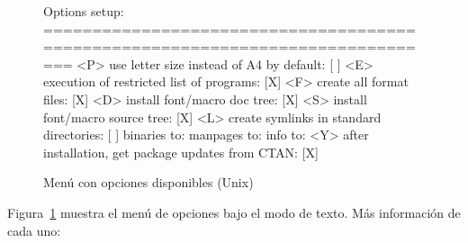 \documentclass{article}
\begin{document}
\begin{figure}[tbh]
\begin{boxedverbatim}
Options setup:
===============================================================================
 <P> use letter size instead of A4 by default: [ ]
 <E> execution of restricted list of programs: [X]
 <F> create all format files:                  [X]
 <D> install font/macro doc tree:              [X]
 <S> install font/macro source tree:           [X]
 <L> create symlinks in standard directories:  [ ]
            binaries to:
            manpages to:
                info to:
 <Y> after installation, get package updates from CTAN: [X]
\end{boxedverbatim}
\caption{Menú con opciones disponibles (Unix)}\label{fig:options-text}
\end{figure}

Figura~\ref{fig:options-text} muestra el menú de opciones bajo el modo de texto. 
Más información de cada uno:
\end{document}
